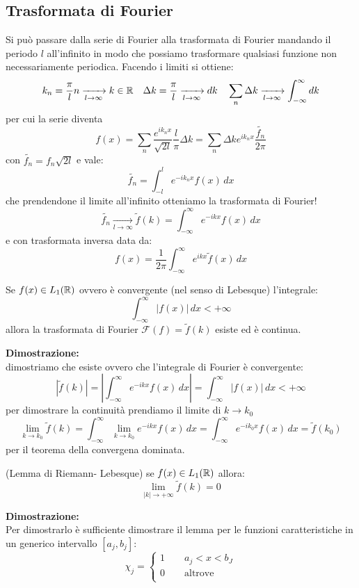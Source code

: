\subsection{Trasformata di Fourier}
Si può passare dalla serie di Fourier alla trasformata di Fourier mandando il periodo $l$ all'infinito in modo che possiamo trasformare qualsiasi funzione non necessariamente periodica. Facendo i limiti si ottiene:
\[k_n = \frac{\pi}{l}n \xrightarrow[l\to \infty]{} k\in\mathbb{R}\quad\Delta k =\frac{\pi}{l} \xrightarrow[l\to \infty]{} dk  \quad\sum_n \Delta k \xrightarrow[l\to \infty]{}\int_{-\infty}^\infty dk\]
per cui la serie diventa
\[f(x) = \sum_n \frac{e^{ik_nx}}{\sqrt{2l}}\frac{l}{\pi}\Delta k = \sum_n \Delta k e^{ik_nx}\frac{\tilde{f_n}}{2\pi}\]
con $\tilde{f_n} = f_n\sqrt{2l}$ e vale:
\[\tilde{f_n} = \int_{-l}^l e^{-ik_nx}f(x)\,dx\]
che prendendone il limite all'infinito otteniamo la trasformata di Fourier!
\[\tilde{f_n}\xrightarrow[l\to \infty]{} \tilde{f}(k) = \int_{-\infty}^\infty e^{-ikx}f(x)\,dx\]
e con trasformata inversa data da:
\[f(x) = \frac{1}{2\pi}\int_{-\infty}^\infty e^{ikx}\tilde{f}(x)\,dx\]
\begin{thm}
Se $f(x)\in L_1(\mathbb{R})$ ovvero è convergente (nel senso di Lebesque) l'integrale:
\[\int_{-\infty}^\infty|f(x)|\,dx<+\infty\] 
allora la trasformata di Fourier $\mathcal{F}(f) = \tilde{f}(k)$ esiste ed è continua.
\end{thm}
\hspace{-1.6em}\textbf{Dimostrazione:}\\
dimostriamo che esiste ovvero che l'integrale di Fourier è convergente:
\[| \tilde{f}(k)| = \left|\int_{-\infty}^\infty e^{-ikx}f(x)\,dx \right| = \int_{-\infty}^\infty |f(x)|\,dx <+\infty \]
per dimostrare la continuità prendiamo il limite di $k\to k_0$
\[\lim_{k\to k_0} \tilde{f}(k) = \int_{-\infty}^\infty \lim_{k\to k_0}  e^{-ikx}f(x)\,dx =  \int_{-\infty}^\infty e^{-ik_0x}f(x)\,dx = \tilde{f}(k_0)\]
per il teorema della convergena dominata.
\begin{lem}
(Lemma di Riemann- Lebesque) se $f(x)\in L_1(\mathbb{R})$ allora:
\[\lim_{|k|\to +\infty} \tilde{f}(k) = 0\]
\end{lem}
\hspace{-1.6em}\textbf{Dimostrazione:}\\
Per dimostrarlo è sufficiente dimostrare il lemma per le funzioni caratteristiche in un generico intervallo $[a_j,b_j]$:
\[\chi_j =\begin{cases}
    1 \qquad a_j<x<b_J  \\
   0\qquad \text{altrove}\\
  \end{cases} \]
